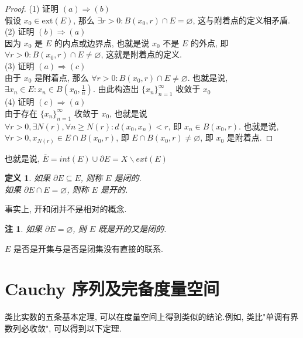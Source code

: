 \documentclass[12pt, a4paper, oneside]{ctexart}
\newtheorem{definition}[theorem]{定义}
\newtheorem{proposition}[theorem]{命题}
\newtheorem{remark}[theorem]{注}
\begin{document}
\begin{proof}
    (1) 证明 $(a)\Rightarrow (b)$\\
    假设 $x_0\in \text{ext}(E)$, 那么 $\exists r > 0: B(x_0, r)\cap E=\varnothing$,
    这与附着点的定义相矛盾.\\
    (2) 证明 $(b)\Rightarrow (a)$\\
    因为 $x_0$ 是 $E$ 的内点或边界点, 也就是说 $x_0$ 不是 $E$ 的外点, 即 $\forall r>0:B(x_0, r)\cap E\neq\varnothing$, 这就是附着点的定义.\\
    (3) 证明 $(a)\Rightarrow (c)$\\
    由于 $x_0$ 是附着点, 那么 $\forall r > 0:B(x_0, r)\cap E\neq \varnothing$.
    也就是说, $\exists x_n\in E:x_n\in B(x_0, \frac1n)$. 由此构造出 $\{x_n\}_{n=1}^{\infty}$ 收敛于 $x_0$\\
    (4) 证明 $(c)\Rightarrow (a)$\\
    由于存在 $\{x_n\}_{n=1}^{\infty}$ 收敛于 $x_0$, 也就是说 $\forall r > 0, \exists N(r), \forall n \geq N(r): d(x_0, x_n)<r$, 即 $x_n\in B(x_0, r)$.
    也就是说, $\forall r>0, x_{N(r)}\in E\cap B(x_0, r)$, 即 $E\cap B(x_0, r)\neq \varnothing$, 即 $x_0$ 是附着点. 
\end{proof}

也就是说, $\overline{E}=int(E)\cup\partial E=X\backslash ext(E)$

\begin{definition}
    如果 $\partial E\subseteq E$, 则称 $E$ 是闭的.\\
    如果 $\partial E \cap E = \varnothing$, 则称 $E$ 是开的.
\end{definition}

事实上, 开和闭并不是相对的概念.

\begin{remark}
    如果 $\partial E=\varnothing$, 则 $E$ 既是开的又是闭的.
\end{remark}

$E$ 是否是开集与是否是闭集没有直接的联系.


\section{Cauchy 序列及完备度量空间}

类比实数的五条基本定理, 可以在度量空间上得到类似的结论.例如, 类比"单调有界数列必收敛", 可以得到以下定理.
\end{document}
